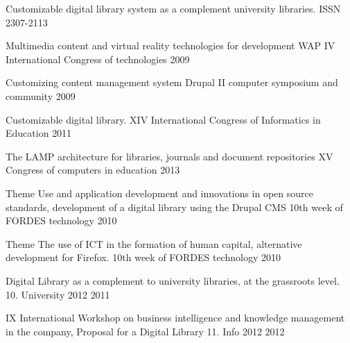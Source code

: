 


\begin{cventries}

\cventry
{Customizable digital library system as a complement university libraries.} %
{ISSN 2307-2113 } %
{} %
{} %
{ %
}

\cventry
{Multimedia content and virtual reality technologies for development WAP} %
{IV International Congress of technologies} %
{} %
{2009} %
{ %
}

\cventry
{Customizing content management system Drupal} %
{II computer symposium and community} %
{} %
{2009} %
{ %
}

\cventry
{Customizable digital library.} %
{XIV International Congress of Informatics in Education} %
{} %
{2011} %
{ %
}

\cventry
{The LAMP architecture for libraries, journals and document repositories} %
{XV Congress of computers in education} %
{} %
{2013} %
{ %
}

\cventry
{Theme Use and application development and innovations in open source standards, development of a digital library using the Drupal CMS} %
{10th week of FORDES technology } %
{} %
{2010} %
{ %
}

\cventry
{Theme The use of ICT in the formation of human capital, alternative development for Firefox.} %
{10th week of FORDES technology } %
{} %
{2010} %
{ %
}

\cventry
{Digital Library as a complement to university libraries, at the grassroots level.} %
{10. University 2012} %
{} %
{2011} %
{ %
}

\cventry
{IX International Workshop on business intelligence and knowledge management in the company, Proposal for a Digital Library} %
{11. Info 2012} %
{} %
{2012} %
{ %
}


\end{cventries}

